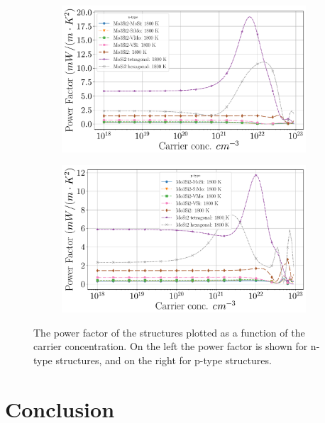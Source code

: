 \documentclass[12pt]{article}
\theoremstyle{plain}
\theoremstyle{definition}
\newcommand{\<}{\langle}
\renewcommand{\>}{\rangle}
\begin{document}
\begin{figure}[b!]
\centering
\begin{subfigure}{.5\textwidth}
  \centering
  \includegraphics[width=\linewidth]{allmats_Po_doping_temp_n}
  \caption{}
  \label{fig:sub1}
\end{subfigure}%
\begin{subfigure}{.5\textwidth}
  \centering
  \includegraphics[width=\linewidth]{allmats_Po_doping_temp_p}
  \caption{}
  \label{fig:sub2}
\end{subfigure}
\caption{The power factor of the structures plotted as a function of the carrier concentration. On the left the power factor is shown for n-type structures, and on the right for p-type structures.}
\label{fig:Po-doping}
\end{figure}

\clearpage

\section{Conclusion}
\end{document}
